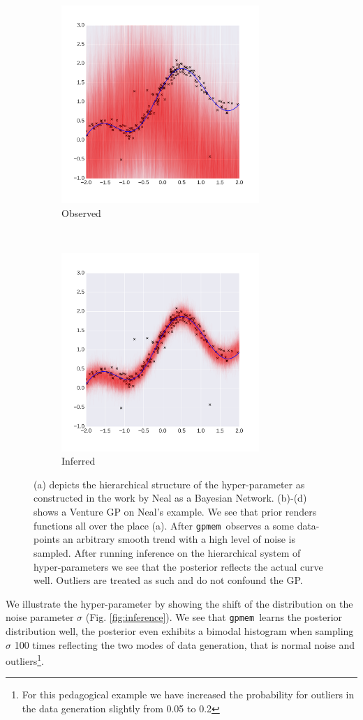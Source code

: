\documentclass{article} %
\newcommand{\gpmem}{\texttt{gpmem}}
\begin{document}
\begin{figure}
        \begin{subfigure}[b]{0.49\textwidth} \centering
                \includegraphics[height=7.5cm]{figs/neal_se_2final.png}
                \caption{Observed}
                \label{fig:NealAO}
        \end{subfigure}
        ~ %
        \begin{subfigure}[b]{0.49\textwidth} \centering
                \includegraphics[height=7.5cm]{figs/neal_se_3final.png}
                \caption{Inferred}
                \label{fig:NealAI}
        \end{subfigure}
        \caption{(a) depicts the hierarchical structure of the hyper-parameter as constructed in the work by Neal as a Bayesian Network. (b)-(d) shows a Venture GP on Neal's example. We see that prior renders functions all over the place (a). After \gpmem\ observes a some data-points an arbitrary smooth trend with a high level of noise is sampled. After running inference on the hierarchical system of hyper-parameters we see that the posterior reflects the actual curve well. Outliers are treated as such and do not confound the GP.}\label{fig:neal}
\end{figure}
We illustrate the hyper-parameter by showing the shift of the distribution on the noise parameter $\sigma$ (Fig. \ref{fig:inference}). We see that \gpmem\ learns the posterior distribution well, the posterior even exhibits a bimodal histogram when sampling $\sigma$ 100 times reflecting the two modes of data generation, that is normal noise and outliers\footnote{For this pedagogical example we have increased the probability for outliers in the data generation slightly from 0.05 to 0.2}. 
\end{document}
